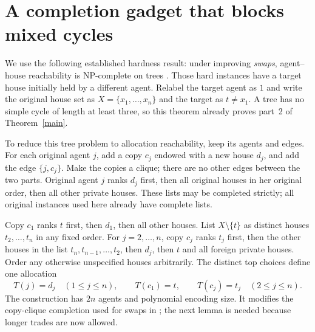 \documentclass[11pt]{article}
\begin{document}
\section{A completion gadget that blocks mixed cycles}
We use the following established hardness result: under improving
\emph{swaps}, agent--house reachability is NP-complete on trees
\cite[Theorem 1]{swaps}. Those hard instances have a target house
initially held by a different agent. Relabel the target agent as $1$
and write the original house set as $X=\{x_1,\ldots,x_n\}$ and the target as
$t\ne x_1$. A tree has no simple cycle of length at least three,
so this theorem already proves part~2 of Theorem~\ref{main}.

To reduce this tree problem to allocation reachability, keep its agents
and edges. For each original agent $j$, add a copy $c_j$ endowed with a
new house $d_j$, and add the edge $\{j,c_j\}$. Make the copies a clique;
there are no other edges between the two parts. Original agent $j$
ranks $d_j$ first, then all original houses in her original order,
then all other private houses. These lists may be completed strictly;
all original instances used here already have complete lists.

Copy $c_1$ ranks $t$ first, then $d_1$, then all other houses. List
$X\setminus\{t\}$ as distinct houses $t_2,\ldots,t_n$ in any fixed
order. For $j=2,\ldots,n$, copy $c_j$ ranks $t_j$ first, then the other
houses in the list $t_n,t_{n-1},\ldots,t_2$, then $d_j$, then $t$ and
all foreign private houses. Order any otherwise unspecified houses arbitrarily.
The distinct top choices define one allocation
\[
 T(j)=d_j\quad(1\leq j\leq n),\qquad
 T(c_1)=t,\qquad T(c_j)=t_j\quad(2\leq j\leq n).
\]
The construction has $2n$ agents and polynomial encoding size. It
modifies the copy-clique completion used for swaps in
\cite[Theorem 2]{swaps}; the next lemma is needed because longer trades
are now allowed.
\end{document}
